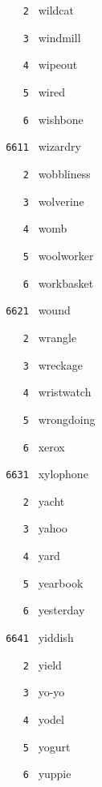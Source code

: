 \documentclass[11pt]{article}
\begin{document}
\begin{multicols}{6}
\noindent \texttt{ \ \ \ 2 } wildcat  \par
\noindent \texttt{ \ \ \ 3 } windmill  \par
\noindent \texttt{ \ \ \ 4 } wipeout  \par
\noindent \texttt{ \ \ \ 5 } wired  \par
\noindent \texttt{ \ \ \ 6 } wishbone  \par
\noindent \texttt{ 6611 } wizardry  \par
\noindent \texttt{ \ \ \ 2 } wobbliness  \par
\noindent \texttt{ \ \ \ 3 } wolverine  \par
\noindent \texttt{ \ \ \ 4 } womb  \par
\noindent \texttt{ \ \ \ 5 } woolworker  \par
\noindent \texttt{ \ \ \ 6 } workbasket  \par
\vspace{3mm}
\noindent \texttt{ 6621 } wound  \par
\noindent \texttt{ \ \ \ 2 } wrangle  \par
\noindent \texttt{ \ \ \ 3 } wreckage  \par
\noindent \texttt{ \ \ \ 4 } wristwatch  \par
\noindent \texttt{ \ \ \ 5 } wrongdoing  \par
\noindent \texttt{ \ \ \ 6 } xerox  \par
\vspace{3mm}
\noindent \texttt{ 6631 } xylophone  \par
\noindent \texttt{ \ \ \ 2 } yacht  \par
\noindent \texttt{ \ \ \ 3 } yahoo  \par
\noindent \texttt{ \ \ \ 4 } yard  \par
\noindent \texttt{ \ \ \ 5 } yearbook  \par
\noindent \texttt{ \ \ \ 6 } yesterday  \par
\vspace{3mm}
\noindent \texttt{ 6641 } yiddish  \par
\noindent \texttt{ \ \ \ 2 } yield  \par
\noindent \texttt{ \ \ \ 3 } yo-yo  \par
\noindent \texttt{ \ \ \ 4 } yodel  \par
\noindent \texttt{ \ \ \ 5 } yogurt  \par
\noindent \texttt{ \ \ \ 6 } yuppie  \par
\vspace{3mm}

\end{multicols}
\end{document}
